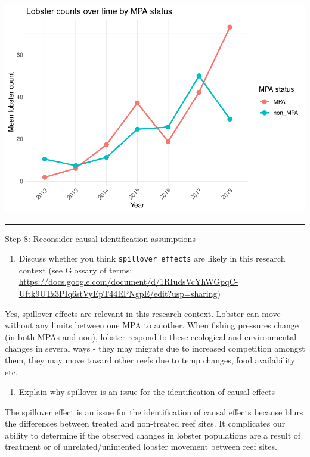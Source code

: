 \documentclass[
]{article}
\providecommand{\tightlist}{%
  \setlength{\itemsep}{0pt}\setlength{\parskip}{0pt}}
\begin{document}
\includegraphics{hw1-lobstrs-eds241_files/figure-latex/unnamed-chunk-32-1.pdf}

\begin{center}\rule{0.5\linewidth}{0.5pt}\end{center}

Step 8: Reconsider causal identification assumptions

\begin{enumerate}
\def\labelenumi{\alph{enumi}.}
\tightlist
\item
  Discuss whether you think \texttt{spillover\ effects} are likely in
  this research context (see Glossary of terms;
  \url{https://docs.google.com/document/d/1RIudsVcYhWGpqC-Uftk9UTz3PIq6stVyEpT44EPNgpE/edit?usp=sharing})
\end{enumerate}

Yes, spillover effects are relevant in this research context. Lobster
can move without any limits between one MPA to another. When fishing
pressures change (in both MPAs and non), lobster respond to these
ecological and environmental changes in several ways - they may migrate
due to increased competition amongst them, they may move toward other
reefs due to temp changes, food availability etc.

\begin{enumerate}
\def\labelenumi{\alph{enumi}.}
\setcounter{enumi}{1}
\tightlist
\item
  Explain why spillover is an issue for the identification of causal
  effects
\end{enumerate}

The spillover effect is an issue for the identification of causal
effects because blurs the differences between treated and non-treated
reef sites. It complicates our ability to determine if the observed
changes in lobster populations are a result of treatment or of
unrelated/unintented lobster movement between reef sites.
\end{document}
